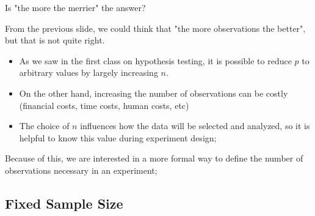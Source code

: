 
\begin{frame}{Is "the more the merrier" the answer?}

  From the previous slide, we could think that "the more observations the better", but that is not quite right.\bigskip

  \begin{itemize}
    \item As we saw in the first class on hypothesis testing, it is possible to
    reduce $p$ to arbitrary values by largely increasing $n$.\bigskip

    \item On the other hand, increasing the number of observations can be costly (financial costs, time costs, human costs, etc)\bigskip

    \item The choice of $n$ influences how the data will be selected and analyzed, so it is helpful to know this value during experiment design;
  \end{itemize}\bigskip

  Because of this, we are interested in a more formal way to define the number of observations necessary in an experiment;
\end{frame}




\subsection{Fixed Sample Size}


